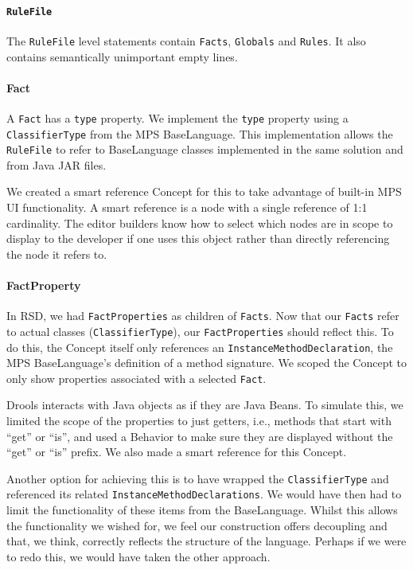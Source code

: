 \paragraph{\texttt{RuleFile}} The \texttt{RuleFile} level statements contain \texttt{Facts}, \texttt{Globals} and \texttt{Rules}.
It also contains semantically unimportant empty lines.

\paragraph{Fact} A \texttt{Fact} has a \texttt{type} property.
We implement the \texttt{type} property using a \texttt{ClassifierType} from the MPS BaseLanguage.
This implementation allows the \texttt{RuleFile} to refer to BaseLanguage classes implemented in the same solution and from Java JAR files.

We created a smart reference Concept for this to take advantage of built-in MPS UI functionality.
A smart reference is a node with a single reference of 1:1 cardinality.
The editor builders know how to select which nodes are in scope to display to the developer if one uses this object rather than directly referencing the node it refers to.

\paragraph{FactProperty} In RSD, we had \texttt{FactProperties} as children of \texttt{Facts}.
Now that our \texttt{Facts} refer to actual classes (\texttt{ClassifierType}), our \texttt{FactProperties} should reflect this.
To do this, the Concept itself only references an \texttt{InstanceMethodDeclaration}, the MPS BaseLanguage's definition of a method signature.
We scoped the Concept to only show properties associated with a selected \texttt{Fact}.

Drools interacts with Java objects as if they are Java Beans.
To simulate this, we limited the scope of the properties to just getters, i.e., methods that start with ``get'' or ``is'', and used a Behavior to make sure they are displayed without the ``get'' or ``is'' prefix.
We also made a smart reference for this Concept.

Another option for achieving this is to have wrapped the \texttt{ClassifierType} and referenced its related \texttt{InstanceMethodDeclarations}.
We would have then had to limit the functionality of these items from the BaseLanguage.
Whilst this allows the functionality we wished for, we feel our construction offers decoupling and that, we think, correctly reflects the structure of the language.
Perhaps if we were to redo this, we would have taken the other approach.

